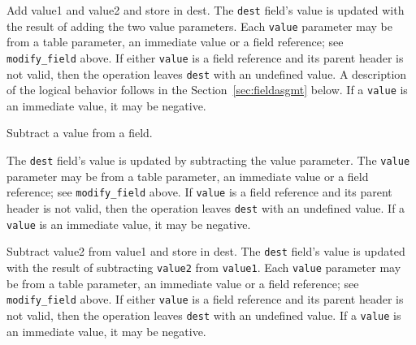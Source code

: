 \documentclass[12pt]{article}
\begin{document}

{ %
Add value1 and value2 and store in dest.
}
{ %
}
{ %
The \texttt{dest} field's value is updated with the result of adding
the two value parameters. Each \texttt{value} parameter may be from a
table parameter, an immediate value or a field reference; see \texttt{modify_field} above. If either \texttt{value}
is a field reference and its parent header is not valid, then
the operation leaves \texttt{dest} with an undefined value.  A description of the logical
behavior follows in the Section~\ref{sec:fieldasgmt} below.  If a
\texttt{value} is an immediate value, it may be negative.
}


{ %
Subtract a value from a field.
}
{ %
}
{ %
The \texttt{dest} field's value is updated by subtracting the value parameter. The \texttt{value} parameter
may be from a table parameter, an immediate value or a field reference; see \texttt{modify_field} above.
If \texttt{value} is a field reference
and its parent header is not valid, then the operation leaves \texttt{dest} with an undefined value.
If a \texttt{value} is an immediate value, it may be negative.

}


{ %
Subtract value2 from value1 and store in dest.
}
{ %
}
{ %
The \texttt{dest} field's value is updated with the result of subtracting
\texttt{value2} from \texttt{value1}. Each \texttt{value} parameter may be from a
table parameter, an immediate value or a field reference; see \texttt{modify_field} above.  If either \texttt{value}
is a field reference and its parent header is not valid, then the operation
leaves \texttt{dest} with an undefined value. If a
\texttt{value} is an immediate value, it may be negative.
}
\end{document}

